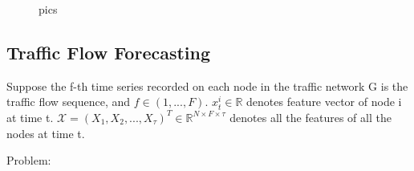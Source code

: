 \documentclass[conference]{IEEEtran}
\begin{document}

\begin{figure}[htbp]
    \centering
    \centering
    \caption{ pics}
\end{figure}


\subsection{Traffic Flow Forecasting}\label{AA}
Suppose the f-th time series recorded on each node in the traffic network G is the traffic flow sequence, and \begin{math} f \in (1, ..., F) \end{math}.
\begin{math} x^i_t\in \mathbb{R}   \end{math} denotes feature vector of node i at time t. \begin{math} \mathcal{X} = (X_1,X_2, ...,X_\tau)^T \in \mathbb{R}^{N\times F\times\tau}\end{math} denotes all the features of all the nodes at time t.
\par Problem:

\end{document}
